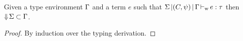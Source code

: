 \begin{lemma}
  \label{lemma:env:flat}
  Given a type environment $\Gamma$ and a term $e$ such
  that $\Sigma \operatorname{|} (C,\mathrm{\psi}) \operatorname{|} \Gamma \operatorname{\vdash_w} e : \tau$
  then $\Downarrow\!\Sigma \subset \Gamma$.
  \begin{proof}
    By induction over the typing derivation.
  \end{proof}
\end{lemma}




